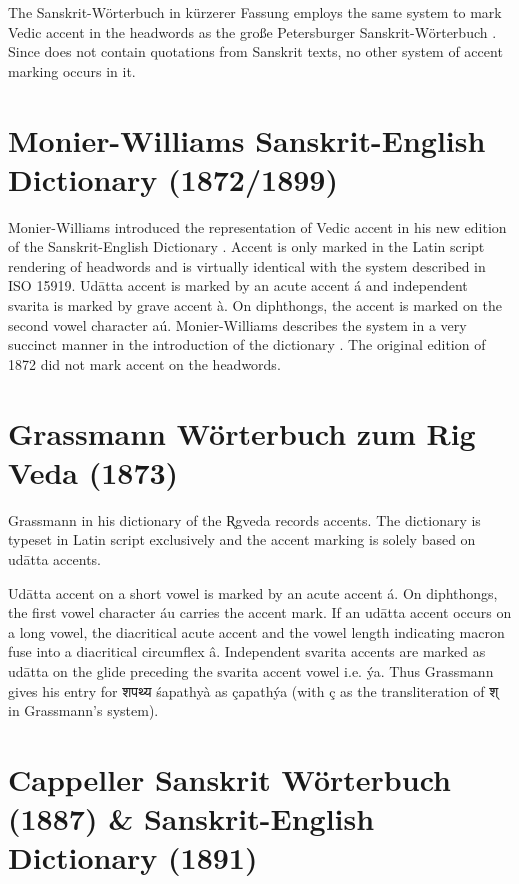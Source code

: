 The Sanskrit-Wörterbuch in kürzerer Fassung \citep{pw} employs the same system to mark Vedic accent in the headwords as the große Petersburger Sanskrit-Wörterbuch \citep{pwg}. Since \citet{pw} does not contain quotations from Sanskrit texts, no other system of accent marking occurs in it.

\section{Monier-Williams Sanskrit-English Dictionary (1872/1899)}

Monier-Williams introduced the representation of Vedic accent in his new edition of the Sanskrit-English Dictionary \citep{mw}. Accent is only marked in the Latin script rendering of headwords and is virtually identical with the system described in ISO 15919. Udātta accent is marked by an acute accent á and independent svarita is marked by grave accent à. On diphthongs, the accent is marked on the second vowel character aú. Monier-Williams describes the system in a very succinct manner in the introduction of the dictionary \citep[][p.~xviii]{mw}. The original edition of 1872 \citep{mw72} did not mark accent on the headwords.

\section{Grassmann Wörterbuch zum Rig Veda (1873)}

Grassmann in his dictionary of the R̥gveda \citep{gra} records accents. The dictionary is typeset in Latin script exclusively and the accent marking is solely based on udātta accents.

Udātta accent on a short vowel is marked by an acute accent á. On diphthongs, the first vowel character áu carries the accent mark. If an udātta accent occurs on a long vowel, the diacritical acute accent and the vowel length indicating macron fuse into a diacritical circumflex â. Independent svarita accents are marked as udātta on the glide preceding the svarita accent vowel i.e. ýa. Thus Grassmann gives his entry for {\devfont शपथ्य} śapathyà as çapathýa (with ç as the transliteration of {\devfont श्} in Grassmann’s system). 

\section{Cappeller Sanskrit Wörterbuch (1887) \& Sanskrit-English Dictionary (1891)}


